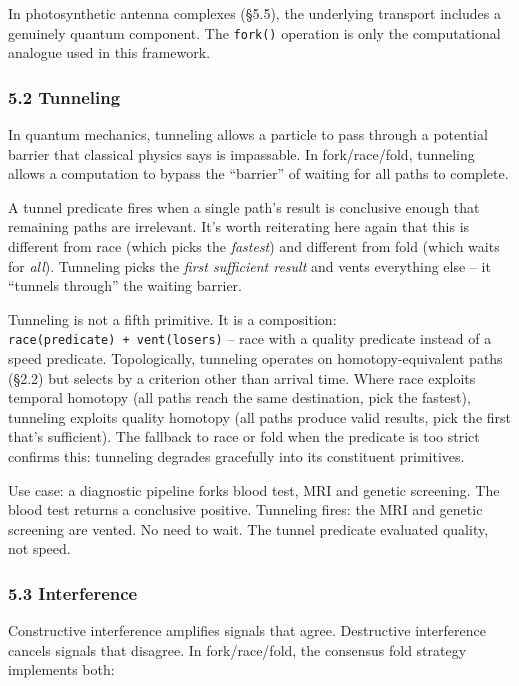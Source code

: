\documentclass[
  11pt,
]{article}
\begin{document}
In photosynthetic antenna complexes (§5.5), the underlying transport
includes a genuinely quantum component. The \texttt{fork()} operation is
only the computational analogue used in this framework.

\subsubsection{5.2 Tunneling}\label{tunneling}

In quantum mechanics, tunneling allows a particle to pass through a
potential barrier that classical physics says is impassable. In
fork/race/fold, tunneling allows a computation to bypass the ``barrier''
of waiting for all paths to complete.

A tunnel predicate fires when a single path's result is conclusive
enough that remaining paths are irrelevant. It's worth reiterating here
again that this is different from race (which picks the \emph{fastest})
and different from fold (which waits for \emph{all}). Tunneling picks
the \emph{first sufficient result} and vents everything else -- it
``tunnels through'' the waiting barrier.

Tunneling is not a fifth primitive. It is a composition:
\texttt{race(predicate)\ +\ vent(losers)} -- race with a quality
predicate instead of a speed predicate. Topologically, tunneling
operates on homotopy-equivalent paths (§2.2) but selects by a criterion
other than arrival time. Where race exploits temporal homotopy (all
paths reach the same destination, pick the fastest), tunneling exploits
quality homotopy (all paths produce valid results, pick the first that's
sufficient). The fallback to race or fold when the predicate is too
strict confirms this: tunneling degrades gracefully into its constituent
primitives.

Use case: a diagnostic pipeline forks blood test, MRI and genetic
screening. The blood test returns a conclusive positive. Tunneling
fires: the MRI and genetic screening are vented. No need to wait. The
tunnel predicate evaluated quality, not speed.

\subsubsection{5.3 Interference}\label{interference}

Constructive interference amplifies signals that agree. Destructive
interference cancels signals that disagree. In fork/race/fold, the
consensus fold strategy implements both:
\end{document}
